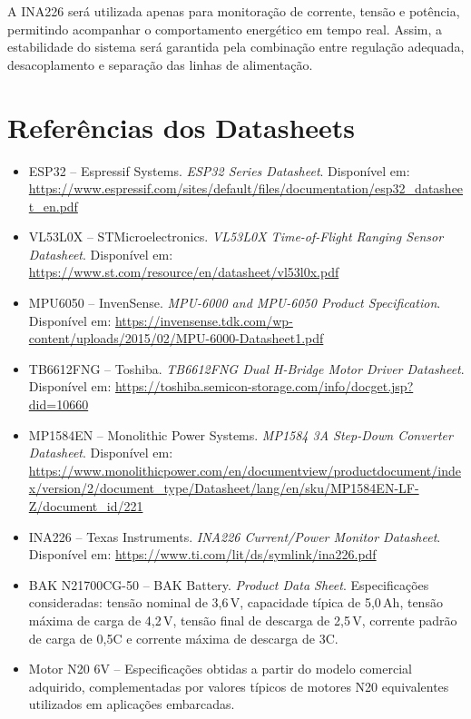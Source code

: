 A INA226 será utilizada apenas para monitoração de corrente, tensão e potência, permitindo acompanhar o comportamento energético em tempo real. Assim, a estabilidade do sistema será garantida pela combinação entre regulação adequada, desacoplamento e separação das linhas de alimentação.

\section{Referências dos Datasheets}
\label{sec:referencias}

\begin{itemize}

    \item ESP32 -- Espressif Systems. \textit{ESP32 Series Datasheet}. Disponível em:
    \url{https://www.espressif.com/sites/default/files/documentation/esp32_datasheet_en.pdf}

    \item VL53L0X -- STMicroelectronics. \textit{VL53L0X Time-of-Flight Ranging Sensor Datasheet}. Disponível em:
    \url{https://www.st.com/resource/en/datasheet/vl53l0x.pdf}

    \item MPU6050 -- InvenSense. \textit{MPU-6000 and MPU-6050 Product Specification}. Disponível em:
    \url{https://invensense.tdk.com/wp-content/uploads/2015/02/MPU-6000-Datasheet1.pdf}

    \item TB6612FNG -- Toshiba. \textit{TB6612FNG Dual H-Bridge Motor Driver Datasheet}. Disponível em:
    \url{https://toshiba.semicon-storage.com/info/docget.jsp?did=10660}

    \item MP1584EN -- Monolithic Power Systems. \textit{MP1584 3A Step-Down Converter Datasheet}. Disponível em:
    \url{https://www.monolithicpower.com/en/documentview/productdocument/index/version/2/document_type/Datasheet/lang/en/sku/MP1584EN-LF-Z/document_id/221}

    \item INA226 -- Texas Instruments. \textit{INA226 Current/Power Monitor Datasheet}. Disponível em:
    \url{https://www.ti.com/lit/ds/symlink/ina226.pdf}

    \item BAK N21700CG-50 -- BAK Battery. \textit{Product Data Sheet}. Especificações consideradas: tensão nominal de 3,6\,V, capacidade típica de 5,0\,Ah, tensão máxima de carga de 4,2\,V, tensão final de descarga de 2,5\,V, corrente padrão de carga de 0,5C e corrente máxima de descarga de 3C.

    \item Motor N20 6V -- Especificações obtidas a partir do modelo comercial adquirido, complementadas por valores típicos de motores N20 equivalentes utilizados em aplicações embarcadas.

\end{itemize}


